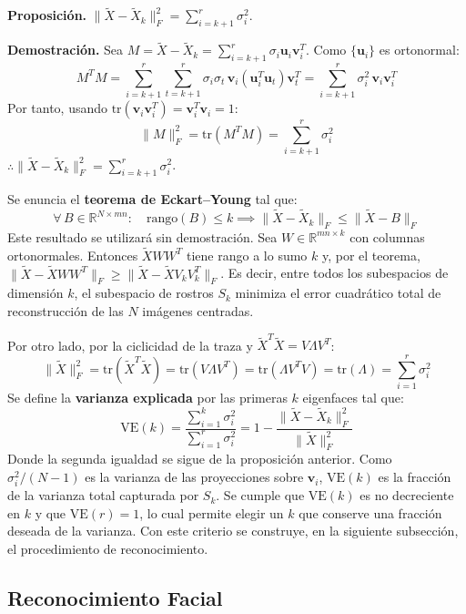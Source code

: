 \textbf{Proposición.} $\|\tilde{X} - \tilde{X}_k\|_F^2 = \sum_{i=k+1}^{r}\sigma_i^2$.
 
\textbf{Demostración.} Sea $M = \tilde{X} - \tilde{X}_k = \sum_{i=k+1}^{r}\sigma_i\mathbf{u}_i\mathbf{v}_i^T$.
Como $\{\mathbf{u}_i\}$ es ortonormal:
\[
M^TM = \sum_{i=k+1}^{r}\sum_{t=k+1}^{r}\sigma_i\sigma_t\,\mathbf{v}_i(\mathbf{u}_i^T\mathbf{u}_t)\mathbf{v}_t^T
= \sum_{i=k+1}^{r}\sigma_i^2\,\mathbf{v}_i\mathbf{v}_i^T
\]
Por tanto, usando $\text{tr}(\mathbf{v}_i\mathbf{v}_i^T) = \mathbf{v}_i^T\mathbf{v}_i = 1$:
\[
\|M\|_F^2 = \text{tr}(M^TM) = \sum_{i=k+1}^{r}\sigma_i^2
\]
$\therefore \|\tilde{X} - \tilde{X}_k\|_F^2 = \sum_{i=k+1}^{r}\sigma_i^2$.
 
Se enuncia el \textbf{teorema de Eckart--Young} \cite{eckart1936approximation} tal que:
\[
\forall \, B \in \mathbb{R}^{N \times mn}: \quad
\text{rango}(B) \leq k \implies \|\tilde{X} - \tilde{X}_k\|_F \leq \|\tilde{X} - B\|_F
\]
Este resultado se utilizará sin demostración. Sea $W \in \mathbb{R}^{mn \times k}$ con
columnas ortonormales. Entonces $\tilde{X}WW^T$ tiene rango a lo sumo $k$ y, por el
teorema, $\|\tilde{X} - \tilde{X}WW^T\|_F \geq \|\tilde{X} - \tilde{X}V_kV_k^T\|_F$.
Es decir, entre todos los subespacios de dimensión $k$, el subespacio de rostros $S_k$
minimiza el error cuadrático total de reconstrucción de las $N$ imágenes centradas.
 
Por otro lado, por la ciclicidad de la traza y $\tilde{X}^T\tilde{X} = V\Lambda V^T$:
\[
\|\tilde{X}\|_F^2 = \text{tr}(\tilde{X}^T\tilde{X}) = \text{tr}(V\Lambda V^T)
= \text{tr}(\Lambda V^TV) = \text{tr}(\Lambda) = \sum_{i=1}^{r}\sigma_i^2
\]
Se define la \textbf{varianza explicada} por las primeras $k$ eigenfaces tal que:
\[
\text{VE}(k) = \frac{\sum_{i=1}^{k}\sigma_i^2}{\sum_{i=1}^{r}\sigma_i^2}
= 1 - \frac{\|\tilde{X} - \tilde{X}_k\|_F^2}{\|\tilde{X}\|_F^2}
\]
Donde la segunda igualdad se sigue de la proposición anterior. Como $\sigma_i^2/(N-1)$
es la varianza de las proyecciones sobre $\mathbf{v}_i$, $\text{VE}(k)$ es la fracción de la
varianza total capturada por $S_k$. Se cumple que $\text{VE}(k)$ es no decreciente en $k$ y
que $\text{VE}(r) = 1$, lo cual permite elegir un $k$ que conserve una fracción
deseada de la varianza. Con este criterio se construye, en la siguiente subsección,
el procedimiento de reconocimiento.
 
 
\subsection{Reconocimiento Facial}
 

